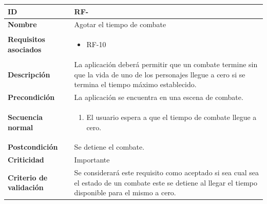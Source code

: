 \begin{center}
	\begin{tabular}{ | p{4.7cm} | p{10cm} | } 
		\hline
		
		\textbf{ID} & RF-\arabic{contador_requisitos_funcionales}
		{contador_requisitos_funcionales} \\
		
		\hline 
		\textbf{Nombre} &
		Agotar el tiempo de combate\\ 
		
		\hline
		\textbf{Requisitos asociados} & 
		\begin{itemize}
			\item RF-10
		\end{itemize}\\
		
		\hline
		\textbf{Descripción} & 
		La aplicación deberá permitir que un combate termine sin que la vida de uno de los personajes llegue a cero si se termina el tiempo máximo establecido.\\
		
		\hline
		\textbf{Precondición} & 
		La aplicación se encuentra en una escena de combate.\\
		
		\hline
		\textbf{Secuencia normal} &
		\begin{enumerate}
			\item El usuario espera a que el tiempo de combate llegue a cero.
		\end{enumerate}
		\\
		
		\hline
		\textbf{Postcondición} & 
		Se detiene el combate.\\
		
		\hline 
		\textbf{Criticidad} &
		Importante\\
		
		\hline 
		\textbf{Criterio de validación} & 
		Se considerará este requisito como aceptado si sea cual sea el estado de un combate este se detiene al llegar el tiempo disponible para el mismo a cero.\\
		
		\hline
	\end{tabular}
\end{center}

